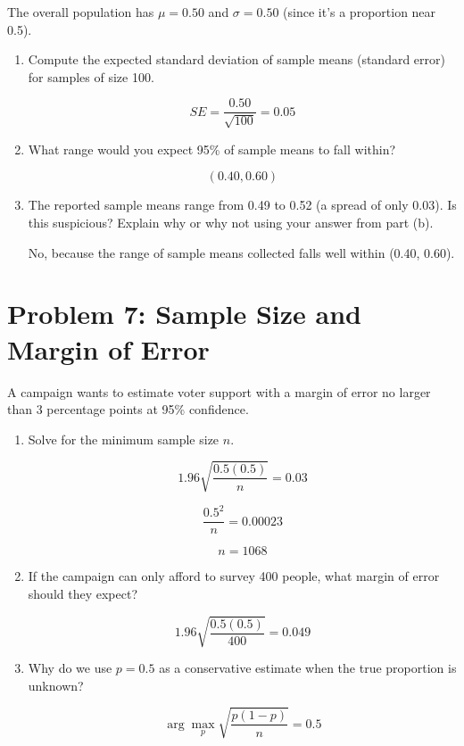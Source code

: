 \documentclass{article}
\begin{document}
The overall population has $\mu = 0.50$ and $\sigma = 0.50$ (since it's a proportion near 0.5).

\begin{enumerate}[label=(\alph*)]
    \item Compute the expected standard deviation of sample means (standard error) for samples of size 100.

    \[
        SE = \frac{0.50}{\sqrt{100}} = 0.05
    \]

    \item What range would you expect 95\% of sample means to fall within?

    \[
        (0.40, 0.60)
    \]

    \item The reported sample means range from 0.49 to 0.52 (a spread of only 0.03). Is this suspicious? Explain why or why not using your answer from part (b).

    No, because the range of sample means collected falls well within (0.40, 0.60). 

\end{enumerate}

\newpage

\section*{Problem 7: Sample Size and Margin of Error}

A campaign wants to estimate voter support with a margin of error no larger than 3 percentage points at 95\% confidence.

\begin{enumerate}[label=(\alph*)]
    \item Solve for the minimum sample size $n$.

    \[
        1.96\sqrt{\frac{0.5(0.5)}{n}} = 0.03
    \]

    \[
        \frac{0.5^2}{n} = 0.00023
    \]

    \[
        n = 1068
    \]

    \item If the campaign can only afford to survey 400 people, what margin of error should they expect?

    \[
        1.96\sqrt{\frac{0.5(0.5)}{400}} = 0.049
    \]

    \item Why do we use $p = 0.5$ as a conservative estimate when the true proportion is unknown?

    \[
        \arg\max_p \sqrt{\frac{p(1-p)}{n}} = 0.5
    \]
\end{enumerate}
\end{document}
